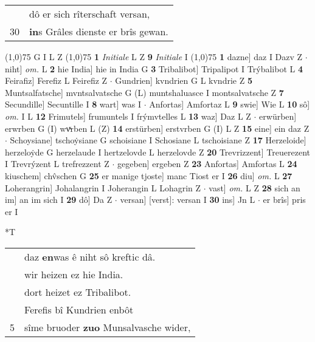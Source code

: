 \documentclass[8pt,a4paper,notitlepage]{article}
\begin{document}
\begin{table}[ht]
\begin{minipage}[t]{0.5\linewidth}
\begin{tabular}{rl}
 & dô er sich rîterschaft versan,\\ 
30 & \textbf{in}s Grâles dienste er brîs gewan.\\ 
\end{tabular}
\scriptsize
\line(1,0){75} \newline
G I L Z \newline
\line(1,0){75} \newline
\textbf{1} \textit{Initiale} L Z  \textbf{9} \textit{Initiale} I  \newline
\line(1,0){75} \newline
\textbf{1} dazne] daz I Dazv Z  $\cdot$ niht] \textit{om.} L \textbf{2} hie India] hie in India G \textbf{3} Tribalibot] Tripalipot I Trýbalibot L \textbf{4} Feirafiz] Ferefiz L Feirefiz Z  $\cdot$ Gundrien] kvndrien G L kvndrie Z \textbf{5} Muntsalfatsche] mvntsalvatsche G (L) muntshaluasce I montsalvatsche Z \textbf{7} Secundille] Secuntille I \textbf{8} wart] was I  $\cdot$ Anfortas] Amfortaz L \textbf{9} swie] Wie L \textbf{10} sô] \textit{om.} I L \textbf{12} Frimutels] frumuntels I frýmvtelles L \textbf{13} waz] Daz L Z  $\cdot$ erwürben] erwrben G (I) wvͯrben L (Z) \textbf{14} erstürben] erstvrben G (I) L Z \textbf{15} eine] ein daz Z  $\cdot$ Schoysiane] tschoẏsiane G schoisiane I Schosiane L tschoisiane Z \textbf{17} Herzeloide] herzeloẏde G herzelaude I hertzelovde L herzelovde Z \textbf{20} Trevrizzent] Treuerezent I Trevrýzent L trefrezzent Z  $\cdot$ gegeben] ergeben Z \textbf{23} Anfortas] Amfortas L \textbf{24} kiuschem] chv̂schen G \textbf{25} er manige tjoste] manc Tiost er I \textbf{26} diu] \textit{om.} L \textbf{27} Loherangrin] Johalangrin I Joherangin L Lohagrin Z  $\cdot$ vast] \textit{om.} L Z \textbf{28} sich an im] an im sich I \textbf{29} dô] Da Z  $\cdot$ versan] [verst]: versan I \textbf{30} ins] Jn L  $\cdot$ er brîs] pris er I \newline
\end{minipage}
\hspace{0.5cm}
\begin{minipage}[t]{0.5\linewidth}
\small
\begin{center}*T
\end{center}
\begin{tabular}{rl}
 & daz \textbf{en}was ê niht sô kreftic dâ.\\ 
 & wir heizen ez hie India.\\ 
 & dort heizet ez Tribalibot.\\ 
 & Ferefis bî Kundrien enbôt\\ 
5 & sîme bruoder \textbf{zuo} Munsalvasche wider,\\ 

\end{tabular}
\end{minipage}
\end{table}
\end{document}
